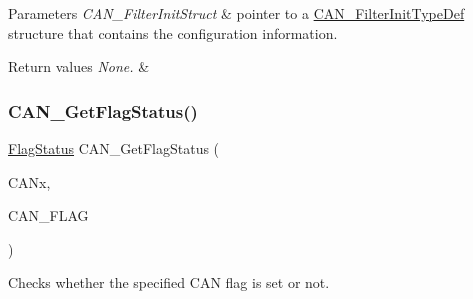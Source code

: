 \begin{DoxyParams}{Parameters}
{\em C\+A\+N\+\_\+\+Filter\+Init\+Struct} & pointer to a \mbox{\hyperlink{struct_c_a_n___filter_init_type_def}{C\+A\+N\+\_\+\+Filter\+Init\+Type\+Def}} structure that contains the configuration information. \\
\hline
\end{DoxyParams}

\begin{DoxyRetVals}{Return values}
{\em None.} & \\
\hline
\end{DoxyRetVals}
\mbox{\label{group___c_a_n___private___functions_ga2faad96caf823ef463cc5b5b25c480bb}} 
\subsubsection{\texorpdfstring{CAN\_GetFlagStatus()}{CAN\_GetFlagStatus()}}
{\footnotesize\ttfamily \mbox{\hyperlink{group___exported__types_ga89136caac2e14c55151f527ac02daaff}{Flag\+Status}} C\+A\+N\+\_\+\+Get\+Flag\+Status (\begin{DoxyParamCaption}\item[{\mbox{\hyperlink{struct_c_a_n___type_def}{C\+A\+N\+\_\+\+Type\+Def}} $\ast$}]{C\+A\+Nx,  }\item[{uint32\+\_\+t}]{C\+A\+N\+\_\+\+F\+L\+AG }\end{DoxyParamCaption})}



Checks whether the specified C\+AN flag is set or not. 


